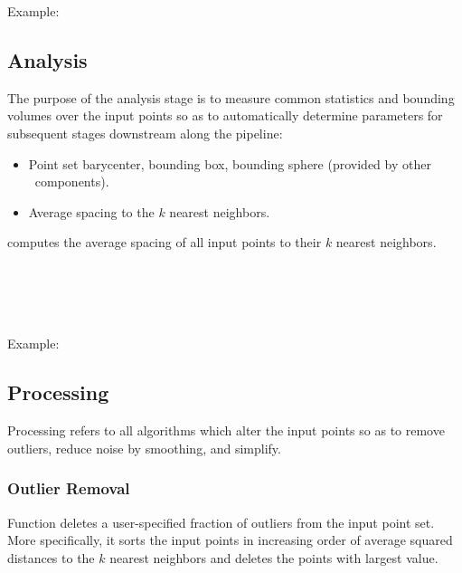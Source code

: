 Example:



\subsection{Analysis}

The purpose of the analysis stage is to measure common statistics and bounding volumes over the input points so as to automatically determine parameters for subsequent stages downstream along the pipeline:
\begin{itemize}
  \item Point set barycenter, bounding box,
        bounding sphere (provided by other \cgal\ components).
  \item Average spacing to the $k$ nearest neighbors.
\end{itemize}

 computes the average spacing of all input points to their $k$ nearest neighbors.

  \\
  \\
  \\
  \\

Example:



\subsection{Processing}

Processing refers to all algorithms which alter the input points so as to remove outliers, reduce noise by smoothing, and simplify.

\subsubsection{Outlier Removal}

Function  deletes a user-specified fraction of outliers from the input point set. More specifically, it sorts the input points in increasing order of average squared distances to the $k$ nearest neighbors and deletes the points with largest value.


